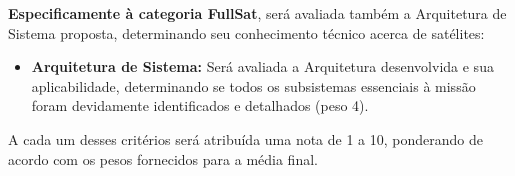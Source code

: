         \textbf{Especificamente à categoria FullSat}, será avaliada também a Arquitetura de Sistema proposta, determinando seu conhecimento técnico acerca de satélites:        
        \begin{itemize}
            \item \textbf{Arquitetura de Sistema:} Será avaliada a Arquitetura desenvolvida e sua aplicabilidade, determinando se todos os subsistemas essenciais à missão foram devidamente identificados e detalhados (peso 4). 
        \end{itemize}
        
        A cada um desses critérios será atribuída uma nota de 1 a 10, ponderando de acordo com os pesos fornecidos para a média final.
